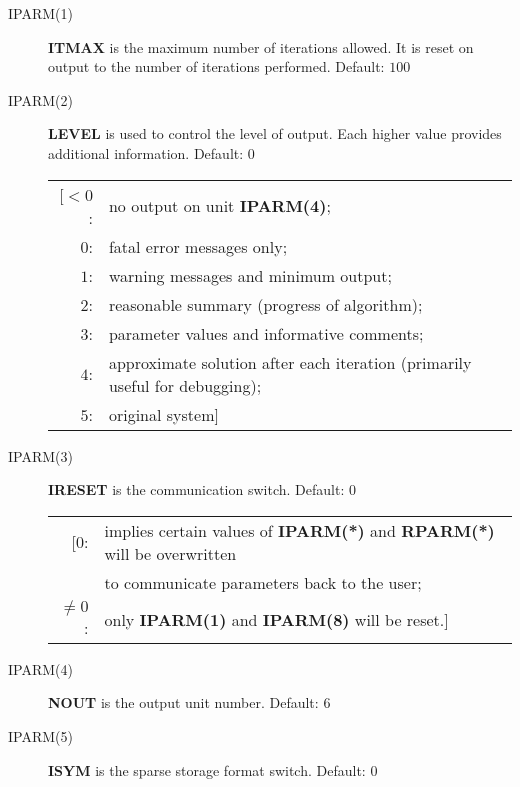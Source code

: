  
\begin{description}
 
 \item[IPARM(1)] {\bf ITMAX} is the maximum number of iterations 
                 allowed.  It is reset on output to the number of 
                 iterations performed. Default: $100$
 
 \item[IPARM(2)] {\bf LEVEL} is used to control the level of output.
                 Each higher value provides additional information.
                 Default: $0$

                 \begin{tabular}{rl} 
                 [$<0$: & no output on unit {\bf IPARM(4)}; \\
                   $0$: & fatal error messages only; \\
                   $1$: & warning messages and minimum output; \\
                   $2$: & reasonable summary (progress of algorithm); \\
                   $3$: & parameter values and informative comments; \\
                   $4$: & approximate solution after each iteration 
                          (primarily useful for debugging); \\
                   $5$: & original system] 
                 \end{tabular} 
 
 \item[IPARM(3)] {\bf IRESET} is the communication switch.  Default: $0$

                 \begin{tabular}{rl} 
                 [$0$: & implies certain values of {\bf IPARM(*)} and 
                         {\bf RPARM(*)} will be overwritten \\
                       & to communicate parameters back to the user; \\
             $\neq 0$: & only {\bf IPARM(1)} and {\bf IPARM(8)} 
                         will be reset.]
                 \end{tabular} 
 
 \item[IPARM(4)] {\bf NOUT} is the output unit number. Default: $6$
 
 \item[IPARM(5)] {\bf ISYM} is the sparse storage format switch. 
                 Default: $0$


\end{description}
